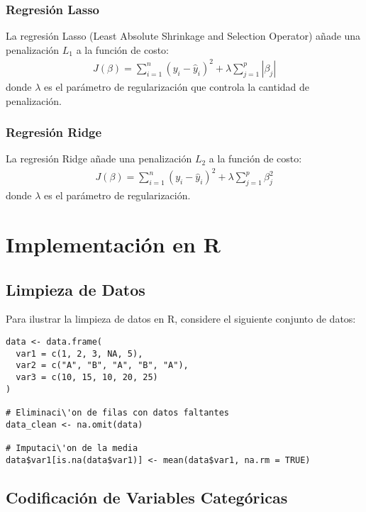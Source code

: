 \documentclass[a4paper]{report} %
\begin{document}
\subsubsection{Regresi\'on Lasso}

La regresi\'on Lasso (Least Absolute Shrinkage and Selection Operator) a\~nade una penalizaci\'on $L_1$ a la funci\'on de costo:
\begin{eqnarray*}
J(\beta) = \sum_{i=1}^{n} (y_i - \hat{y}_i)^2 + \lambda \sum_{j=1}^{p} |\beta_j|
\end{eqnarray*}
donde $\lambda$ es el par\'ametro de regularizaci\'on que controla la cantidad de penalizaci\'on.

\subsubsection{Regresi\'on Ridge}

La regresi\'on Ridge a\~nade una penalizaci\'on $L_2$ a la funci\'on de costo:
\begin{eqnarray*}
J(\beta) = \sum_{i=1}^{n} (y_i - \hat{y}_i)^2 + \lambda \sum_{j=1}^{p} \beta_j^2
\end{eqnarray*}
donde $\lambda$ es el par\'ametro de regularizaci\'on.

\section{Implementaci\'on en R}

\subsection{Limpieza de Datos}

Para ilustrar la limpieza de datos en R, considere el siguiente conjunto de datos:
\begin{verbatim}
data <- data.frame(
  var1 = c(1, 2, 3, NA, 5),
  var2 = c("A", "B", "A", "B", "A"),
  var3 = c(10, 15, 10, 20, 25)
)

# Eliminaci\'on de filas con datos faltantes
data_clean <- na.omit(data)

# Imputaci\'on de la media
data$var1[is.na(data$var1)] <- mean(data$var1, na.rm = TRUE)
\end{verbatim}

\subsection{Codificaci\'on de Variables Categ\'oricas}
\end{document}
